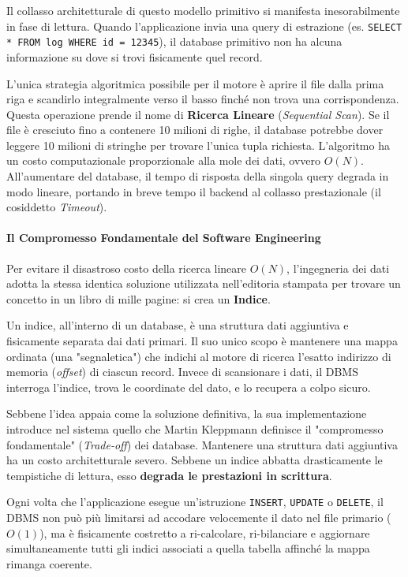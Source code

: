 Il collasso architetturale di questo modello primitivo si manifesta inesorabilmente in fase di lettura. Quando l'applicazione invia una query di estrazione (es. \texttt{SELECT * FROM log WHERE id = 12345}), il database primitivo non ha alcuna informazione su dove si trovi fisicamente quel record. 

L'unica strategia algoritmica possibile per il motore è aprire il file dalla prima riga e scandirlo integralmente verso il basso finché non trova una corrispondenza. Questa operazione prende il nome di \textbf{Ricerca Lineare} (\textit{Sequential Scan}). Se il file è cresciuto fino a contenere 10 milioni di righe, il database potrebbe dover leggere 10 milioni di stringhe per trovare l'unica tupla richiesta. L'algoritmo ha un costo computazionale proporzionale alla mole dei dati, ovvero $O(N)$. All'aumentare del database, il tempo di risposta della singola query degrada in modo lineare, portando in breve tempo il backend al collasso prestazionale (il cosiddetto \textit{Timeout}).

\paragraph{Il Compromesso Fondamentale del Software Engineering}

Per evitare il disastroso costo della ricerca lineare $O(N)$, l'ingegneria dei dati adotta la stessa identica soluzione utilizzata nell'editoria stampata per trovare un concetto in un libro di mille pagine: si crea un \textbf{Indice}. 

Un indice, all'interno di un database, è una struttura dati aggiuntiva e fisicamente separata dai dati primari. Il suo unico scopo è mantenere una mappa ordinata (una "segnaletica") che indichi al motore di ricerca l'esatto indirizzo di memoria (\textit{offset}) di ciascun record. Invece di scansionare i dati, il DBMS interroga l'indice, trova le coordinate del dato, e lo recupera a colpo sicuro.

Sebbene l'idea appaia come la soluzione definitiva, la sua implementazione introduce nel sistema quello che Martin Kleppmann definisce il "compromesso fondamentale" (\textit{Trade-off}) dei database. Mantenere una struttura dati aggiuntiva ha un costo architetturale severo. Sebbene un indice abbatta drasticamente le tempistiche di lettura, esso \textbf{degrada le prestazioni in scrittura}. 

Ogni volta che l'applicazione esegue un'istruzione \texttt{INSERT}, \texttt{UPDATE} o \texttt{DELETE}, il DBMS non può più limitarsi ad accodare velocemente il dato nel file primario ($O(1)$), ma è fisicamente costretto a ri-calcolare, ri-bilanciare e aggiornare simultaneamente tutti gli indici associati a quella tabella affinché la mappa rimanga coerente.

